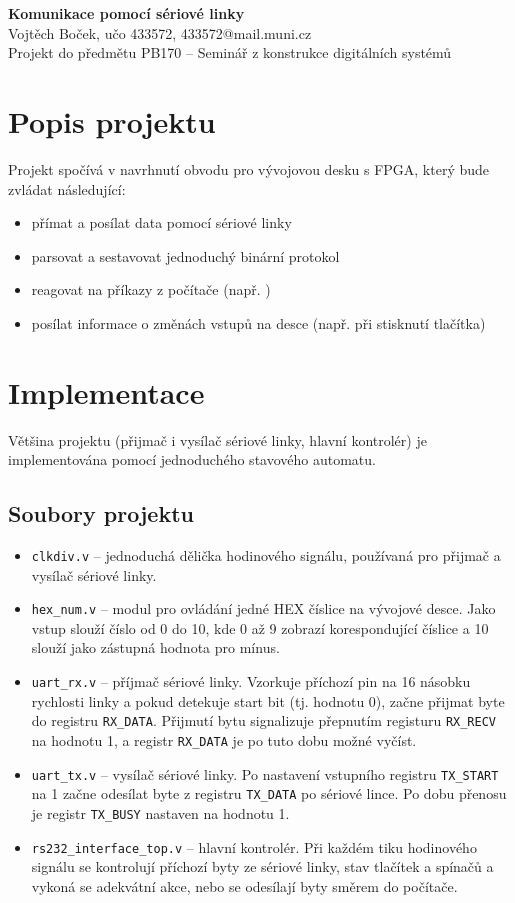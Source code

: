 \documentclass[12pt, a4paper, oneside]{article}
\newcommand{\B}{\textbf} %
\begin{document}
\setlength{\voffset}{-20mm}
\begin{center}

{\Large\B{Komunikace pomocí sériové linky}} \\
{\large Vojtěch Boček, učo 433572, 433572@mail.muni.cz} \\
{Projekt do předmětu PB170 -- Seminář z konstrukce digitálních systémů} \\

\end{center}

\section{Popis projektu}
Projekt spočívá v navrhnutí obvodu pro vývojovou desku s FPGA, který bude zvládat následující:
\begin{itemize}
    \item přímat a posílat data pomocí sériové linky
    \item parsovat a sestavovat jednoduchý binární protokol
    \item reagovat na příkazy z počítače (např. )
    \item posílat informace o změnách vstupů na desce (např. při stisknutí tlačítka)
\end{itemize}

\section{Implementace}
Většina projektu (přijmač i vysílač sériové linky, hlavní kontrolér) je implementována pomocí jednoduchého stavového automatu.
\subsection{Soubory projektu}
\begin{itemize}
    \item \verb-clkdiv.v- -- jednoduchá dělička hodinového signálu, používaná pro přijmač a vysílač sériové linky.
    \item \verb-hex_num.v- -- modul pro ovládání jedné HEX číslice na vývojové desce. Jako vstup slouží číslo od 0 do 10, kde 0 až 9 zobrazí korespondující číslice a 10 slouží jako zástupná hodnota pro mínus.
    \item \verb-uart_rx.v- -- příjmač sériové linky. Vzorkuje příchozí pin na 16 násobku rychlosti linky a pokud detekuje start bit (tj. hodnotu 0), začne přijmat byte do registru \verb-RX_DATA-. Přijmutí bytu signalizuje přepnutím registuru \verb-RX_RECV- na hodnotu 1, a registr \verb-RX_DATA- je po tuto dobu možné vyčíst.
    \item \verb-uart_tx.v- -- vysílač sériové linky. Po nastavení vstupního registru \verb-TX_START- na 1 začne odesílat byte z registru \verb-TX_DATA- po sériové lince. Po dobu přenosu je registr \verb-TX_BUSY- nastaven na hodnotu 1.
    \item \verb-rs232_interface_top.v- -- hlavní kontrolér. Při každém tiku hodinového signálu se kontrolují příchozí byty ze sériové linky, stav tlačítek a spínačů a vykoná se adekvátní akce, nebo se odesílají byty směrem do počítače.
\end{itemize}
\end{document}

